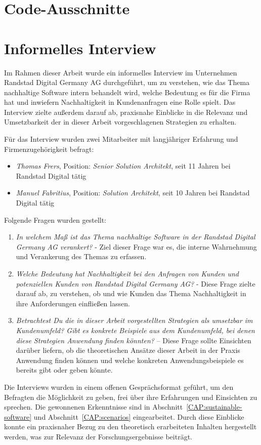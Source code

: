 \chapter{Code-Ausschnitte}




\chapter{Informelles Interview}\label{CAP:interview}
Im Rahmen dieser Arbeit wurde ein informelles Interview im Unternehmen Randstad Digital Germany AG durchgeführt, um zu verstehen, wie das Thema nachhaltige Software intern behandelt wird, welche Bedeutung es für die Firma hat und inwiefern Nachhaltigkeit in Kundenanfragen eine Rolle spielt.
Das Interview zielte außerdem darauf ab, praxisnahe Einblicke in die Relevanz und Umsetzbarkeit der in dieser Arbeit vorgeschlagenen Strategien zu erhalten.

Für das Interview wurden zwei Mitarbeiter mit langjähriger Erfahrung und Firmenzugehörigkeit befragt:
\begin{itemize}
    \item \textit{Thomas Frers}, Position: \textit{Senior Solution Architekt}, seit 11 Jahren bei Randstad Digital tätig
    \item \textit{Manuel Fabritius}, Position: \textit{Solution Architekt}, seit 10 Jahren bei Randstad Digital tätig
\end{itemize}
Folgende Fragen wurden gestellt:
\begin{enumerate}
    \item \textit{\glqq In welchem Maß ist das Thema nachhaltige Software in der Randstad Digital Germany AG verankert?\grqq{}} - Ziel dieser Frage war es, die interne Wahrnehmung und Verankerung des Themas zu erfassen.
    \item \textit{\glqq Welche Bedeutung hat Nachhaltigkeit bei den Anfragen von Kunden und potenziellen Kunden von Randstad Digital Germany AG?\grqq{}} - Diese Frage zielte darauf ab, zu verstehen, ob und wie Kunden das Thema Nachhaltigkeit in ihre Anforderungen einfließen lassen.
    \item \textit{\glqq Betrachtest Du die in dieser Arbeit vorgestellten Strategien als umsetzbar im Kundenumfeld? Gibt es konkrete Beispiele aus dem Kundenumfeld, bei denen diese Strategien Anwendung finden könnten?\grqq{}} – Diese Frage sollte Einsichten darüber liefern, ob die theoretischen Ansätze dieser Arbeit in der Praxis Anwendung finden können und welche konkreten Anwendungsbeispiele es bereits gibt oder geben könnte.
\end{enumerate}
Die Interviews wurden in einem offenen Gesprächsformat geführt, um den Befragten die Möglichkeit zu geben, frei über ihre Erfahrungen und Einsichten zu sprechen.
Die gewonnenen Erkenntnisse sind in Abschnitt~\ref{CAP:sustainable-software} und Abschnitt~\ref{CAP:scenarios} eingearbeitet.
Durch diese Einblicke konnte ein praxisnaher Bezug zu den theoretisch erarbeiteten Inhalten hergestellt werden, was zur Relevanz der Forschungsergebnisse beiträgt.
